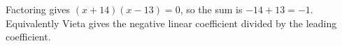 Factoring gives $(x+14)(x-13)=0$, so the sum is $-14+13=\boxed{-1}$. Equivalently Vieta gives the negative linear coefficient divided by the leading coefficient.
